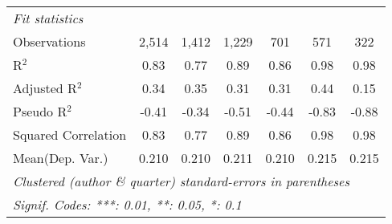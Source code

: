 \begin{tabular}{lcccccc}
   \midrule
   \emph{Fit statistics}\\
   Observations                                               & 2,514          & 1,412          & 1,229         & 701          & 571           & 322\\  
   R$^2$                                                      & 0.83           & 0.77           & 0.89          & 0.86         & 0.98          & 0.98\\  
   Adjusted R$^2$                                             & 0.34           & 0.35           & 0.31          & 0.31         & 0.44          & 0.15\\  
   Pseudo R$^2$                                               & -0.41          & -0.34          & -0.51         & -0.44        & -0.83         & -0.88\\  
   Squared Correlation                                        & 0.83           & 0.77           & 0.89          & 0.86         & 0.98          & 0.98\\  
Mean(Dep. Var.) & 0.210 & 0.210 & 0.211 & 0.210 & 0.215 & 0.215 \\
   \midrule \midrule
   \multicolumn{7}{l}{\emph{Clustered (author \& quarter) standard-errors in parentheses}}\\
   \multicolumn{7}{l}{\emph{Signif. Codes: ***: 0.01, **: 0.05, *: 0.1}}\\
\end{tabular}
\par\endgroup
